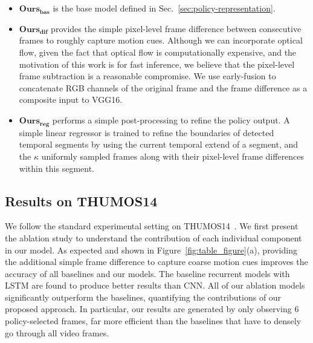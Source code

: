 \documentclass{bmvc2k}
\begin{document}
\begin{itemize}[noitemsep,topsep=0pt]
	\item $\textbf{Ours}_{\textbf{bas}}$ is the base model defined in Sec.~\ref{sec:policy-representation}.
	\item $\textbf{Ours}_{\textbf{dif}}$ provides the simple pixel-level frame difference between consecutive frames to roughly capture motion cues. Although we can incorporate optical flow, given the fact that optical flow is computationally expensive, and the motivation of this work is for fast inference, we believe that the pixel-level frame subtraction is a reasonable compromise. We use early-fusion to concatenate RGB channels of the original frame and the frame difference as a composite input to VGG16. 
	\item $\textbf{Ours}_{\textbf{reg}}$ performs a simple post-processing to refine the policy output. A simple linear regressor is trained to refine the boundaries of detected temporal segments by using the current temporal extend of a segment, and the $\kappa$ uniformly sampled frames along with their pixel-level frame differences within this segment. 
\end{itemize}


\subsection{Results on THUMOS14}


We follow the standard experimental setting on THUMOS14~\cite{THUMOS14}. We first present the ablation study to understand the contribution of each individual component in our model. As expected and shown in Figure~\ref{fig:table_figure}(a), providing the additional simple frame difference to capture coarse motion cues improves the accuracy of all baselines and our models. The baseline recurrent models with LSTM are found to produce better results than CNN. %
All of our ablation models significantly outperform the baselines, quantifying the contributions of our proposed approach. In particular, our results are generated by only observing 6 policy-selected frames, far more efficient than the baselines that have to densely go through all video frames.      
\end{document}
